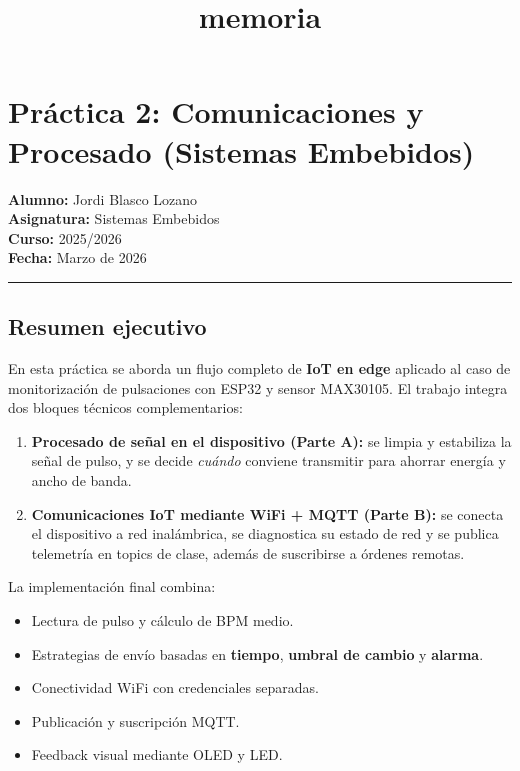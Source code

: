 \documentclass[11pt]{article}
\title{memoria}
\providecommand{\tightlist}{%
      \setlength{\itemsep}{0pt}\setlength{\parskip}{0pt}}
\begin{document}
    
    \maketitle
    
    

    
    \section{Práctica 2: Comunicaciones y Procesado (Sistemas
Embebidos)}\label{pruxe1ctica-2-comunicaciones-y-procesado-sistemas-embebidos}

\textbf{Alumno:} Jordi Blasco Lozano\\
\textbf{Asignatura:} Sistemas Embebidos\\
\textbf{Curso:} 2025/2026\\
\textbf{Fecha:} Marzo de 2026

\begin{center}\rule{0.5\linewidth}{0.5pt}\end{center}

\subsection{Resumen ejecutivo}\label{resumen-ejecutivo}

En esta práctica se aborda un flujo completo de \textbf{IoT en edge}
aplicado al caso de monitorización de pulsaciones con ESP32 y sensor
MAX30105. El trabajo integra dos bloques técnicos complementarios:

\begin{enumerate}
\def\labelenumi{\arabic{enumi}.}
\tightlist
\item
  \textbf{Procesado de señal en el dispositivo (Parte A):} se limpia y
  estabiliza la señal de pulso, y se decide \emph{cuándo} conviene
  transmitir para ahorrar energía y ancho de banda.
\item
  \textbf{Comunicaciones IoT mediante WiFi + MQTT (Parte B):} se conecta
  el dispositivo a red inalámbrica, se diagnostica su estado de red y se
  publica telemetría en topics de clase, además de suscribirse a órdenes
  remotas.
\end{enumerate}

La implementación final combina:

\begin{itemize}
\tightlist
\item
  Lectura de pulso y cálculo de BPM medio.
\item
  Estrategias de envío basadas en \textbf{tiempo}, \textbf{umbral de
  cambio} y \textbf{alarma}.
\item
  Conectividad WiFi con credenciales separadas.
\item
  Publicación y suscripción MQTT.
\item
  Feedback visual mediante OLED y LED.
\end{itemize}
\end{document}
